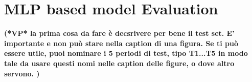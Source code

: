 
\section{MLP based model Evaluation}\label{sec:mlpeval}

{\bf (*VP* la prima cosa da fare è decsrivere per bene il test set. E' importante e non può stare nella caption di una figura. Se ti può essere utile, puoi nominare i 5 periodi di test, tipo T1...T5 in modo tale da usare questi nomi nelle caption delle figure, o dove altro servono. ) }







